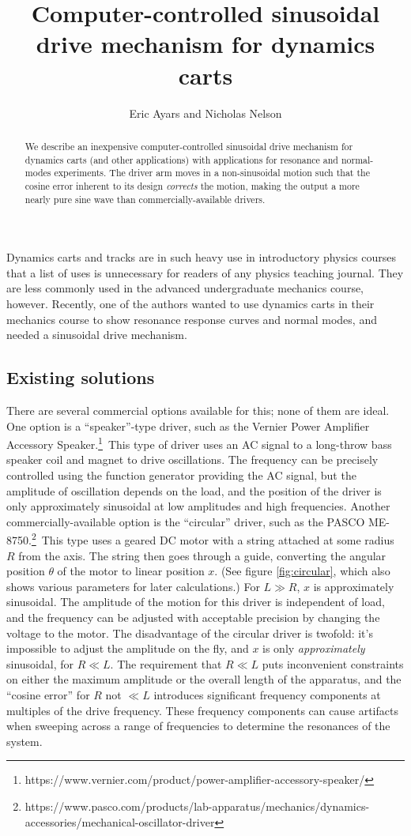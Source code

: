 \documentclass[11 pt]{article}
\title{Computer-controlled sinusoidal drive mechanism for dynamics carts}
\author{Eric Ayars and Nicholas Nelson}
\begin{document}
\maketitle

\begin{abstract}
We describe an inexpensive computer-controlled sinusoidal drive mechanism for dynamics carts (and other applications) with applications for resonance and normal-modes experiments.
The driver arm moves in a non-sinusoidal motion such that the cosine error inherent to its design \emph{corrects} the motion, making the output a more nearly pure sine wave than commercially-available drivers.
\end{abstract}

Dynamics carts and tracks are in such heavy use in introductory physics courses that a list of uses is unnecessary for readers of any physics teaching journal.
They are less commonly used in the advanced undergraduate mechanics course, however.
Recently, one of the authors wanted to use dynamics carts in their mechanics course to show resonance response curves and normal modes, and needed a sinusoidal drive mechanism.

\subsection*{Existing solutions}
There are several commercial options available for this; none of them are ideal. 
One option is a ``speaker''-type driver, such as the Vernier Power Amplifier Accessory Speaker.\footnote{https://www.vernier.com/product/power-amplifier-accessory-speaker/}\  
This type of driver uses an AC signal to a long-throw bass speaker coil and magnet to drive oscillations. 
The frequency can be precisely controlled using the function generator providing the AC signal, but the amplitude of oscillation depends on the load, and the position of the driver is only approximately sinusoidal at low amplitudes and high frequencies.
Another commercially-available option is the ``circular'' driver, such as the PASCO ME-8750.\footnote{https://www.pasco.com/products/lab-apparatus/mechanics/dynamics-accessories/mechanical-oscillator-driver}\ 
This type uses a geared DC motor with a string attached at some radius $R$ from the axis. The string then goes through a guide, converting the angular position $\theta$ of the motor to linear position $x$. (See figure \ref{fig:circular}, which also shows various parameters for later calculations.) 
For $L\gg R$, $x$ is approximately sinusoidal. 
The amplitude of the motion for this driver is independent of load, and the frequency can be adjusted with acceptable precision by changing the voltage to the motor.
The disadvantage of the circular driver is twofold: it's impossible to adjust the amplitude on the fly, and $x$ is only \emph{approximately} sinusoidal, for $R \ll L$.
The requirement that $R \ll L$ puts inconvenient constraints on either the maximum amplitude or the overall length of the apparatus, and the ``cosine error'' for $R$ not $\ll L$ introduces significant frequency components at multiples of the drive frequency. 
These frequency components can cause artifacts when sweeping across a range of frequencies to determine the resonances of the system.
\end{document}
